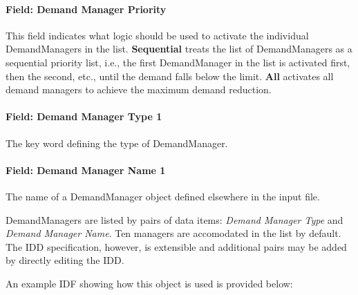 \paragraph{Field: Demand Manager Priority}\label{field-demand-manager-priority}

This field indicates what logic should be used to activate the individual DemandManagers in the list. \textbf{Sequential} treats the list of DemandManagers as a sequential priority list, i.e., the first DemandManager in the list is activated first, then the second, etc., until the demand falls below the limit. \textbf{All} activates all demand managers to achieve the maximum demand reduction.

\paragraph{Field: Demand Manager Type 1}\label{field-demand-manager-type-1}

The key word defining the type of DemandManager.

\paragraph{Field: Demand Manager Name 1}\label{field-demand-manager-name-1}

The name of a DemandManager object defined elsewhere in the input file.

DemandManagers are listed by pairs of data items: \emph{Demand Manager Type} and \emph{Demand Manager Name}. Ten managers are accomodated in the list by default. The IDD specification, however, is extensible and additional pairs may be added by directly editing the IDD.

An example IDF showing how this object is used is provided below:

